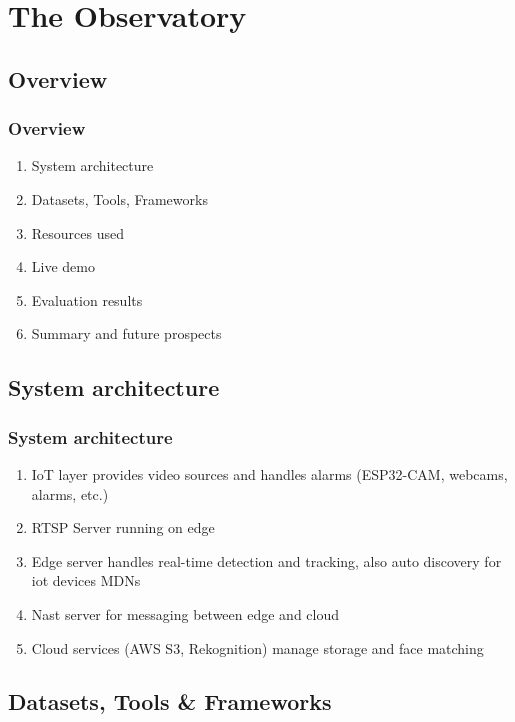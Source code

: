 \documentclass[11pt,t,usepdftitle=false,aspectratio=169]{beamer}
\begin{document}
\section{The Observatory}

\subsection{Overview}

\begin{frame}
	\frametitle{Overview}


	\bigskip
	\begin{enumerate}
		\item {System architecture}
		\item Datasets, Tools, Frameworks
		\item Resources used
		\item {Live demo}
		\item {Evaluation results}
		\item Summary and future prospects
	\end{enumerate}

\end{frame}

\subsection{System architecture}

\begin{frame}
	\frametitle{System architecture}
	\begin{enumerate}
		\item IoT layer provides video sources and handles alarms (ESP32-CAM, webcams, alarms, etc.)
		\item RTSP Server running on edge
		\item Edge server handles real-time detection and tracking, also auto discovery for iot devices MDNs
		\item Nast server for messaging between edge and cloud
		\item Cloud services (AWS S3, Rekognition) manage storage and face matching
	\end{enumerate}
\end{frame}

\subsection{Datasets, Tools \& Frameworks}
\end{document}

